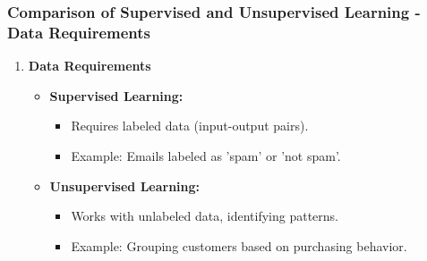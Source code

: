 \documentclass[aspectratio=169]{beamer}
\begin{document}
\begin{frame}[fragile]
    \frametitle{Comparison of Supervised and Unsupervised Learning - Data Requirements}
    \begin{enumerate}
        \item \textbf{Data Requirements}
        \begin{itemize}
            \item \textbf{Supervised Learning:}
            \begin{itemize}
                \item Requires labeled data (input-output pairs).
                \item Example: Emails labeled as 'spam' or 'not spam'.
            \end{itemize}
            \item \textbf{Unsupervised Learning:}
            \begin{itemize}
                \item Works with unlabeled data, identifying patterns.
                \item Example: Grouping customers based on purchasing behavior.
            \end{itemize}
        \end{itemize}
    \end{enumerate}
\end{frame}
\end{document}
